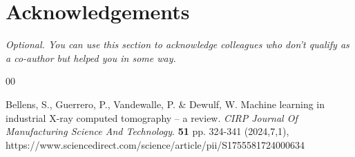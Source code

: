 \documentclass[preprint,12pt, a4paper]{elsarticle}
\begin{document}
\section*{Acknowledgements}
\textit{Optional. You can use this section to acknowledge colleagues who don’t qualify as a co-author but helped you in some way. }






\begin{thebibliography}{00}


Bellens, S., Guerrero, P., Vandewalle, P. \& Dewulf, W. Machine learning in industrial X-ray computed tomography – a review. {\em CIRP Journal Of Manufacturing Science And Technology}. \textbf{51} pp. 324-341 (2024,7,1), https://www.sciencedirect.com/science/article/pii/S1755581724000634


\end{thebibliography}
\end{document}
